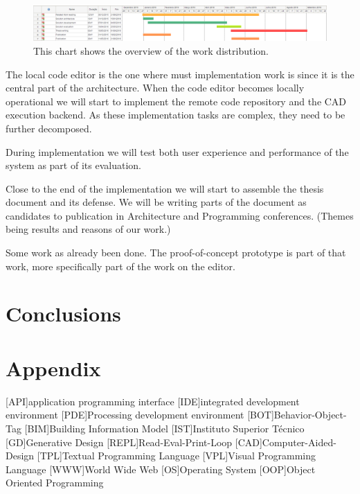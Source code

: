 \documentclass{./llncs2e/llncs}
\begin{document}
	\begin{figure}
		\centering
		\includegraphics[width=1.0\textwidth]{img/schedule}
		\caption{This chart shows the overview of the work distribution.}
		\label{fig:schedule}
	\end{figure}
	
	The local code editor is the one where must implementation work is since it is the central part of the architecture.
	When the code editor becomes locally operational we will start to implement the remote code repository and the CAD execution backend.
	As these implementation tasks are complex, they need to be further decomposed.
	
	During implementation we will test both user experience and performance of the system as part of its evaluation.
	
	Close to the end of the implementation we will start to assemble the thesis document and its defense.
	We will be writing parts of the document as candidates to publication in Architecture and Programming conferences.
	(Themes being results and reasons of our work.)
	
	Some work as already been done.
	The proof-of-concept prototype is part of that work, more specifically part of the work on the editor.
		
	

\section{Conclusions}

\newpage
\appendix
\section{Appendix}
\label{sec:attachments}

\begin{acronym}
	[API]{application programming interface}
	[IDE]{integrated development environment}
	[PDE]{Processing development environment}
	[BOT]{Behavior-Object-Tag}
	[BIM]{Building Information Model}
	[IST]{Instituto Superior Técnico}
	[GD]{Generative Design}
	[REPL]{Read-Eval-Print-Loop}
	[CAD]{Computer-Aided-Design}
	[TPL]{Textual Programming Language}
	[VPL]{Visual Programming Language}
	[WWW]{World Wide Web}
	[OS]{Operating System}
	[OOP]{Object Oriented Programming}
\end{acronym}

% 
% 
 

 
\end{document}
